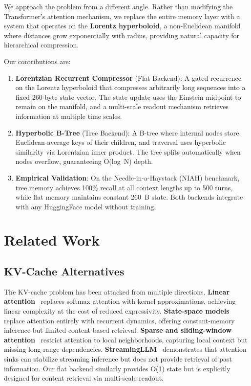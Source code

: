 \documentclass[conference]{IEEEtran}
\begin{document}
We approach the problem from a different angle. Rather than modifying the Transformer's attention mechanism, we replace the entire memory layer with a system that operates on the \textbf{Lorentz hyperboloid}, a non-Euclidean manifold where distances grow exponentially with radius, providing natural capacity for hierarchical compression.

Our contributions are:

\begin{enumerate}
  \item \textbf{Lorentzian Recurrent Compressor} (Flat Backend): A gated recurrence on the Lorentz hyperboloid that compresses arbitrarily long sequences into a fixed 260-byte state vector. The state update uses the Einstein midpoint to remain on the manifold, and a multi-scale readout mechanism retrieves information at multiple time scales.
  \item \textbf{Hyperbolic B-Tree} (Tree Backend): A B-tree where internal nodes store Euclidean-average keys of their children, and traversal uses hyperbolic similarity via Lorentzian inner product. The tree splits automatically when nodes overflow, guaranteeing O(log~N) depth.
  \item \textbf{Empirical Validation}: On the Needle-in-a-Haystack (NIAH) benchmark, tree memory achieves 100\% recall at all context lengths up to 500 turns, while flat memory maintains constant 260~B state. Both backends integrate with any HuggingFace model without training.
\end{enumerate}

\section{Related Work}

\subsection{KV-Cache Alternatives}

The KV-cache problem has been attacked from multiple directions. \textbf{Linear attention}~\cite{katharopoulos2020linear} replaces softmax attention with kernel approximations, achieving linear complexity at the cost of reduced expressivity. \textbf{State-space models}~\cite{gu2023mamba, peng2023rwkv} replace attention entirely with recurrent dynamics, offering constant-memory inference but limited content-based retrieval. \textbf{Sparse and sliding-window attention}~\cite{child2019generating, beltagy2020longformer} restrict attention to local neighborhoods, capturing local context but missing long-range dependencies. \textbf{StreamingLLM}~\cite{xiao2024streamingllm} demonstrates that attention sinks can stabilize streaming inference but does not provide retrieval of past information. Our flat backend similarly provides O(1) state but is explicitly designed for content retrieval via multi-scale readout.
\end{document}
